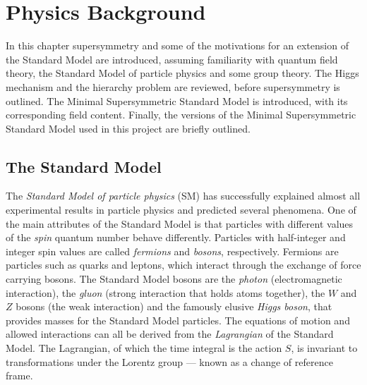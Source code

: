\documentclass[twoside,english]{uiofysmaster}
\makeatletter
\newenvironment{chapquote}[2][2em]
  {\setlength{\@tempdima}{#1}%
   \def\chapquote@author{#2}%
   \parshape 1 \@tempdima \dimexpr\textwidth-2\@tempdima\relax%
   \itshape}
  {\par\normalfont\hfill--\ \chapquote@author\hspace*{\@tempdima}\par\bigskip}
\makeatother
\begin{document}
\chapter{Physics Background}\label{Chapter:Physics Background}

 

In this chapter supersymmetry and some of the motivations for an extension of the Standard Model are introduced, assuming familiarity with quantum field theory, the Standard Model of particle physics and some group theory. The Higgs mechanism and the hierarchy problem are reviewed, before supersymmetry is outlined. The Minimal Supersymmetric Standard Model is introduced, with its corresponding field content. Finally, the versions of the Minimal Supersymmetric Standard Model used in this project are briefly outlined.

\section{The Standard Model}

The \textit{Standard Model of particle physics} (SM) has successfully explained almost all experimental results in particle physics and predicted several phenomena. One of the main attributes of the Standard Model is that particles with different values of the \textit{spin} quantum number behave differently. Particles with half-integer and integer spin values are called \textit{fermions} and \textit{bosons}, respectively. Fermions are particles such as quarks and leptons, which interact through the exchange of force carrying bosons. The Standard Model bosons are the \textit{photon} (electromagnetic interaction), the \textit{gluon} (strong interaction that holds atoms together), the $W$ and $Z$ bosons (the weak interaction) and the famously elusive \textit{Higgs boson}, that provides masses for the Standard Model particles. The equations of motion and allowed interactions can all be derived from the \textit{Lagrangian} of the Standard Model. The Lagrangian, of which the time integral is the action $S$, is invariant to transformations under the Lorentz group --- known as a change of reference frame. 
\end{document}
